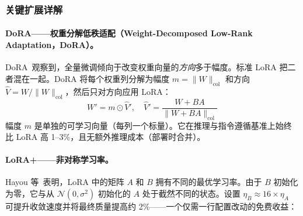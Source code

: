 \subsubsection{关键扩展详解}
\label{key-extensions-explained}

\paragraph{DoRA——权重分解低秩适配（Weight-Decomposed Low-Rank Adaptation，DoRA）。}
\label{dora-weight-decomposed-low-rank-adaptation.}

DoRA~\cite{liu2024dora}观察到，全量微调倾向于改变权重向量的\emph{方向}多于幅度。标准 LoRA 把二者混在一起。DoRA 将每个权重列分解为幅度 $m = \|W\|_\text{col}$ 和方向 $\hat{V} = W / \|W\|_\text{col}$，然后只对方向应用 LoRA：
\[
W' = m \odot \hat{V}', \quad \hat{V}' = \frac{W + BA}{\|W + BA\|_\text{col}}
\]
幅度 $m$ 是单独的可学习向量（每列一个标量）。它在推理与指令遵循基准上始终比 LoRA 高 1--3\%，且无额外推理成本（部署时合并）。

\newpage
\paragraph{LoRA+——非对称学习率。}
\label{lora-asymmetric-learning-rates.}

Hayou 等~\cite{hayou2024loraplus}表明，LoRA 中的矩阵 $A$ 和 $B$ 拥有不同的最优学习率。由于 $B$ 初始化为零，它与从 $\mathcal{N}(0, \sigma^2)$ 初始化的 $A$ 处于截然不同的状态。设置 $\eta_B \approx 16 \times \eta_A$ 可提升收敛速度并将最终质量提高约 2\%——一个仅需一行配置改动的免费收益：

